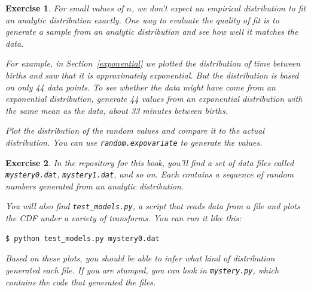 \documentclass[12pt]{book}
\theoremstyle{exercise}
\newtheorem{exercise}{Exercise}[chapter]
\begin{document}
\begin{exercise}
For small values of $n$, we don't expect an empirical distribution
to fit an analytic distribution exactly.  One way to evaluate
the quality of fit is to generate a sample from an analytic
distribution and see how well it matches the data.%
%
%

For example, in Section~\ref{exponential} we plotted the distribution
of time between births and saw that it is approximately exponential.
But the distribution is based on only 44 data points.  To see whether
the data might have come from an exponential distribution, generate 44
values from an exponential distribution with the same mean as the
data, about 33 minutes between births.

Plot the distribution of the random values and compare it to the
actual distribution.  You can use {\tt random.expovariate} 
to generate the values.

\end{exercise}

\begin{exercise}
In the repository for this book, you'll find a set of data files
called {\tt mystery0.dat}, {\tt mystery1.dat}, and so on.  Each
contains a sequence of random numbers generated from an analytic
distribution.%

You will also find \verb"test_models.py", a script that reads
data from a file and plots the CDF under a variety of transforms.
You can run it like this:

\begin{verbatim}
$ python test_models.py mystery0.dat
\end{verbatim}

Based on these plots, you should be able to infer what kind of
distribution generated each file.  If you are stumped, you can
look in {\tt mystery.py}, which contains the code that generated
the files.

\end{exercise}
\end{document}
